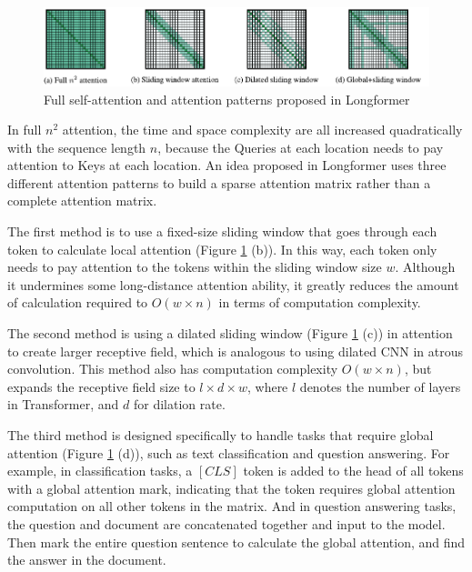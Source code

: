 \begin{figure}[!ht]
    \centering
    \includegraphics[width=\textwidth]{literature/imgs/ext-longformer.pdf}
    \caption{Full self-attention and attention patterns proposed in Longformer \cite{beltagy2020longformer}}
    \label{fig:ext-longformer}
\end{figure}

In full $n^2$ attention, the time and space complexity are all increased quadratically with the sequence length $n$, because the Queries at each location needs to pay attention to Keys at each location.
An idea proposed in Longformer uses three different attention patterns to build a sparse attention matrix rather than a complete attention matrix.

The first method is to use a fixed-size sliding window that goes through each token to calculate local attention (Figure \ref{fig:ext-longformer} (b)).
In this way, each token only needs to pay attention to the tokens within the sliding window size $w$.
Although it undermines some long-distance attention ability, it greatly reduces the amount of calculation required to $O(w \times n)$ in terms of computation complexity.

The second method is using a dilated sliding window (Figure \ref{fig:ext-longformer} (c)) in attention to create larger receptive field, which is analogous to using dilated CNN in atrous convolution.
This method also has computation complexity $O(w \times n)$, but expands the receptive field size to $l \times d \times w$, where $l$ denotes the number of layers in Transformer, and $d$ for dilation rate.

The third method is designed specifically to handle tasks that require global attention (Figure \ref{fig:ext-longformer} (d)), such as text classification and question answering.
For example, in classification tasks, a $[CLS]$ token is added to the head of all tokens with a global attention mark, indicating that the token requires global attention computation on all other tokens in the matrix.
And in question answering tasks, the question and document are concatenated together and input to the model.
Then mark the entire question sentence to calculate the global attention, and find the answer in the document.

